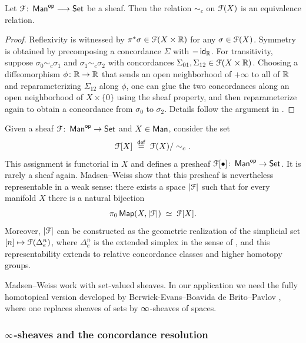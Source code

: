 \begin{lemma}\label{ch3:: lem: concordance is equiv}
    Let $\mathcal F\colon \operatorname{\sf Man}^{\mathsf{op}} \longrightarrow \operatorname{{\mathsf{Set}}}$ be a sheaf. Then the relation
    $\sim_c$ on $\mathcal F(X)$ is an equivalence relation.
\end{lemma}

\begin{proof}
  Reflexivity is witnessed by $\pi^*\sigma\in\mathcal F(X\times\mathbb R)$ for any
  $\sigma\in\mathcal F(X)$. Symmetry is obtained by precomposing a concordance
  $\Sigma$ with $-\operatorname{\sf id}_{\mathbb R}$. For transitivity, suppose
  $\sigma_0\sim_c\sigma_1$ and $\sigma_1\sim_c\sigma_2$ with concordances
  $\Sigma_{01},\Sigma_{12}\in\mathcal F(X\times\mathbb R)$. Choosing a diffeomorphism
  $\phi\colon\mathbb R\to\mathbb R$ that sends an open neighborhood of $+\infty$ to all of
  $\mathbb R$ and reparameterizing $\Sigma_{12}$ along $\phi$, one can glue the two
  concordances along an open neighborhood of $X\times\{0\}$ using the sheaf
  property, and then reparameterize again to obtain a concordance from
  $\sigma_0$ to $\sigma_2$. Details follow the argument in \cite[Lemma~3.1]{BBEP24}.
\end{proof}

\begin{remark}\label{ch3:: rmk: MW-representability}
  Given a sheaf $\mathcal F\colon\operatorname{\sf Man}^{\mathsf{op}}\to\operatorname{{\mathsf{Set}}}$ and $X\in\operatorname{\sf Man}$, consider the set
  \[
    \mathcal F[X] \;\overset{\sf def}{=}\; \mathcal F(X)/\sim_c.
  \]
  This assignment is functorial in $X$ and defines a presheaf
  $\mathcal F[\bullet]\colon\operatorname{\sf Man}^{\mathsf{op}}\to\operatorname{{\mathsf{Set}}}$. It is rarely a sheaf again. Madsen--Weiss
  show that this presheaf is nevertheless representable in a weak sense:
  there exists a space $|\mathcal F|$ such that for every manifold $X$ there is a
  natural bijection
  \[
    \pi_0\operatorname{{\sf Map}}(X,|\mathcal F|)\;\simeq\;\mathcal F[X].
  \]
  Moreover, $|\mathcal F|$ can be constructed as the geometric realization of the
  simplicial set $[n]\mapsto \mathcal F(\Delta^n_e)$, where $\Delta^n_e$ is the
  extended simplex in the sense of \cite[Definition~2.4.2]{MW07}, and this
  representability extends to relative concordance classes and higher
  homotopy groups.
\end{remark}

Madsen--Weiss work with set-valued sheaves. In our application we need the
fully homotopical version developed by Berwick-Evans--Boavida de Brito--Pavlov
\cite{BBEP24}, where one replaces sheaves of sets by $\operatorname{\infty}$-sheaves of spaces.
\bigskip

\subsubsection{\texorpdfstring{$\operatorname{\infty}$}{infty}-sheaves and the concordance resolution}

